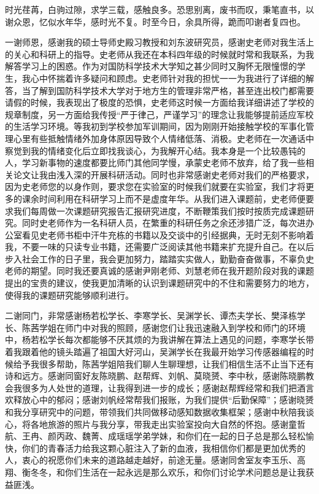 

\begin{ack}
\par 时光荏苒，白驹过隙，求学三载，感触良多。恐思别离，废书而叹，秉笔直书，以谢众恩，忆似水年华，感时光不复。时至今日，余具所得，跪而叩谢者复四也。
\par 一谢师恩，感谢我的硕士导师史殿习教授和刘东波研究员，感谢史老师对我生活上的关心和科研上的指导。史老师从我还在本科四年级的时候就时常和我联系，为我解答学习上的困惑。作为对国防科学技术大学知之甚少同时又胸怀无限憧憬的学生，我心中怀揣着许多疑问和顾虑。史老师针对我的担忧一一为我进行了详细的解答，当了解到国防科学技术大学对于地方生的管理非常严格，甚至连出校门都需要请假的时候，我表现出了极度的恐惧，史老师这时候一方面给我详细讲述了学校的规章制度，另一方面给我传授“严于律己，严谨学习”的理念让我能够提前适应军校的生活学习环境。等我初到学校参加军训期间，因为刚刚开始接触学校的军事化管理心里有些抵触情绪外加身体原因导致个人情绪低落、消极。史老师在一次通话中察觉到我的情绪变化后立即找我谈心，为我解开心结。我本身是一个比较愚钝的人，学习新事物的速度都要比师门其他同学慢，承蒙史老师不放弃，给了我一些相关论文让我由浅入深的开展科研活动。同时也非常感谢史老师对我们的严格要求，因为史老师您的以身作则，要求您在实验室的时候我们就要在实验室，我们才将更多的课余时间利用在科研学习上而不是虚度年华。从我们进入课题前，史老师便要求我们每周做一次课题研究报告汇报研究进度，不断鞭策我们按时按质完成课题研究。同时史老师作为一名科研人员，在繁重的科研任务之余还涉猎广泛，每次进办公室看见史老师书柜中汗牛充栋的书籍以及交谈中的引经据典，无时无刻不影响着我，不要一味的只读专业书籍，还需要广泛阅读其他书籍来扩充提升自己。在以后步入社会工作的日子里，我会更加努力，踏踏实实做人，勤勤奋奋做事，不辜负史老师的期望。同时我还要真诚的感谢尹刚老师、刘慧老师在我开题阶段对我的课题提出的宝贵的建议，使我更加清晰的认识到课题研究中的不住和需要努力的地方，使得我的课题研究能够顺利进行。

\par 二谢同门，非常感谢杨若松学长、李寒学长、吴渊学长、谭杰夫学长、樊泽栋学长、陈茜学姐在师门中对我的照顾，感谢您们让我迅速融入到学校和师门的环境中，杨若松学长每次都能够不厌其烦的为我讲解在算法上遇见的问题，李寒学长带着我跟着他的镜头踏遍了祖国大好河山，吴渊学长在我最开始学习传感器编程的时候给予我很多帮助，陈茜学姐陪我们聊人生聊理想，让我们相信生活不止当下还有诗和远方。感谢同窗好友陈晓鹏、赵帮辉、刘帆、莫晓赟、李中秋，感谢陈晓鹏教会我很多为人处世的道理，让我得到进一步的成长；感谢赵帮辉经常和我们把酒言欢释放心中的郁闷；感谢刘帆经常帮我们报账，为我们提供“后勤保障”；感谢晓赟和我分享研究中的问题，带领我们共同做移动感知数据收集框架；感谢中秋陪我谈心，将各地旅游的照片与我分享，带我走出实验室投向大自然的怀抱。感谢童哲航、王冉、颜丙政、魏菁、成瑶瑶学弟学妹，和你们在一起的日子总是那么轻松愉快，你们的青春活力给我这颗心脏注入了新的血液，我相信你们都是更加优秀的人，衷心的祝愿你们未来的道路越走越好，前途无量。感谢同舍室友李玉乐、高翔、衡冬冬，和你们生活在一起永远是那么欢乐，和你们讨论学术问题总是让我获益匪浅。


\end{ack}
